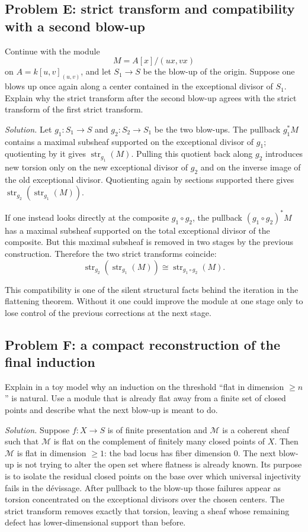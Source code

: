 \documentclass[11pt,oneside]{article}
\newcommand{\M}{\mathcal M}
\newcommand{\st}{\operatorname{str}}
\begin{document}
\subsection*{Problem E: strict transform and compatibility with a second blow-up}

Continue with the module
\[
M=A[x]/(ux,vx)
\]
on $A=k[u,v]_{(u,v)}$, and let $S_1\to S$ be the blow-up of the origin.  Suppose one blows up once again along a center contained in the exceptional divisor of $S_1$.  Explain why the strict transform after the second blow-up agrees with the strict transform of the first strict transform.

\emph{Solution.}  Let $g_1\colon S_1\to S$ and $g_2\colon S_2\to S_1$ be the two blow-ups.  The pullback $g_1^*M$ contains a maximal subsheaf supported on the exceptional divisor of $g_1$; quotienting by it gives $\st_{g_1}(M)$.  Pulling this quotient back along $g_2$ introduces new torsion only on the new exceptional divisor of $g_2$ and on the inverse image of the old exceptional divisor.  Quotienting again by sections supported there gives $\st_{g_2}(\st_{g_1}(M))$.

If one instead looks directly at the composite $g_1\circ g_2$, the pullback $(g_1\circ g_2)^*M$ has a maximal subsheaf supported on the total exceptional divisor of the composite.  But this maximal subsheaf is removed in two stages by the previous construction.  Therefore the two strict transforms coincide:
\[
\st_{g_2}(\st_{g_1}(M))\cong \st_{g_1\circ g_2}(M).
\]

This compatibility is one of the silent structural facts behind the iteration in the flattening theorem.  Without it one could improve the module at one stage only to lose control of the previous corrections at the next stage.

\subsection*{Problem F: a compact reconstruction of the final induction}

Explain in a toy model why an induction on the threshold ``flat in dimension $\ge n$'' is natural.  Use a module that is already flat away from a finite set of closed points and describe what the next blow-up is meant to do.

\emph{Solution.}  Suppose $f\colon X\to S$ is of finite presentation and $\M$ is a coherent sheaf such that $\M$ is flat on the complement of finitely many closed points of $X$.  Then $\M$ is flat in dimension $\ge 1$: the bad locus has fiber dimension $0$.  The next blow-up is not trying to alter the open set where flatness is already known.  Its purpose is to isolate the residual closed points on the base over which universal injectivity fails in the d\'evissage.  After pullback to the blow-up those failures appear as torsion concentrated on the exceptional divisors over the chosen centers.  The strict transform removes exactly that torsion, leaving a sheaf whose remaining defect has lower-dimensional support than before.
\end{document}
